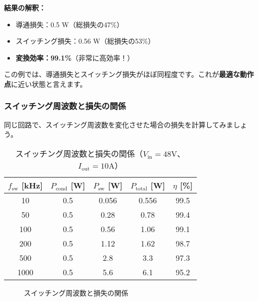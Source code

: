 \begin{screen}
\textbf{結果の解釈：}

\begin{itemize}
\item 導通損失：0.5 W（総損失の47\%）
\item スイッチング損失：0.56 W（総損失の53\%）
\item \textbf{変換効率：99.1\%}（非常に高効率！）
\end{itemize}

この例では、導通損失とスイッチング損失がほぼ同程度です。これが\textbf{最適な動作点}に近い状態と言えます。
\end{screen}

\subsubsection{スイッチング周波数と損失の関係}

同じ回路で、スイッチング周波数を変化させた場合の損失を計算してみましょう。

\begin{table}[H]
\centering
\caption{スイッチング周波数と損失の関係（$V_{\text{in}}=48$V、$I_{\text{out}}=10$A）}
\begin{tabular}{|c|c|c|c|c|}
\hline
\textbf{$f_{\text{sw}}$ [kHz]} & \textbf{$P_{\text{cond}}$ [W]} & \textbf{$P_{\text{sw}}$ [W]} & \textbf{$P_{\text{total}}$ [W]} & \textbf{$\eta$ [\%]} \\
\hline
\hline
10 & 0.5 & 0.056 & 0.556 & 99.5 \\
\hline
50 & 0.5 & 0.28 & 0.78 & 99.4 \\
\hline
100 & 0.5 & 0.56 & 1.06 & 99.1 \\
\hline
200 & 0.5 & 1.12 & 1.62 & 98.7 \\
\hline
500 & 0.5 & 2.8 & 3.3 & 97.3 \\
\hline
1000 & 0.5 & 5.6 & 6.1 & 95.2 \\
\hline
\end{tabular}
\end{table}

\begin{figure}[H]
\centering
{}
\caption{スイッチング周波数と損失の関係}
\end{figure}

